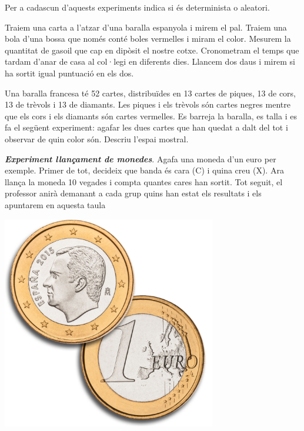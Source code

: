 \begin{mylist}
\exer \mental Per a cadascun d'aquests experiments indica si és determinista o aleatori.
\begin{tasks} 
	\task  Traiem una carta a l'atzar d'una baralla espanyola i mirem el pal.
	\task  Traiem una bola d'una bossa que només conté boles vermelles i miram el color.
	\task  Mesurem la quantitat de gasoil que cap en dipòsit el nostre cotxe.
	\task  Cronometram el temps que tardam d'anar de casa al col·legi en diferents dies.
	\task  Llancem dos daus i mirem si ha sortit igual puntuació en els dos.
\end{tasks}

\exer  Una baralla francesa té 52 cartes, distribuïdes en 13 cartes de piques, 13 de cors, 13 de trèvols i 13 de diamants. Les piques i els trèvols són cartes negres mentre que els cors i els diamants són cartes vermelles. Es barreja la baralla, es talla i es fa el següent experiment: agafar les dues cartes que han quedat a dalt del tot i observar de quin color són. Descriu l'espai mostral. 
  
\vspace{-2cm}
\exer \simbolsearch \begin{minipage}[t]{0.7\textwidth} \textit{\bf Experiment llançament de monedes}. Agafa una moneda d'un euro per exemple. Primer de tot, decideix que banda és cara (C) i quina creu (X). Ara llança la moneda 10 vegades i compta quantes cares han sortit.  Tot seguit, el professor anirà demanant a cada grup quins han estat els resultats i els apuntarem en aquesta taula
	\end{minipage}
\begin{minipage}{0.3\textwidth}
	\vspace{2cm}
	\centering
	\includegraphics[width=0.7\textwidth]{img-04/monedes}
\end{minipage}
	


\end{mylist}
